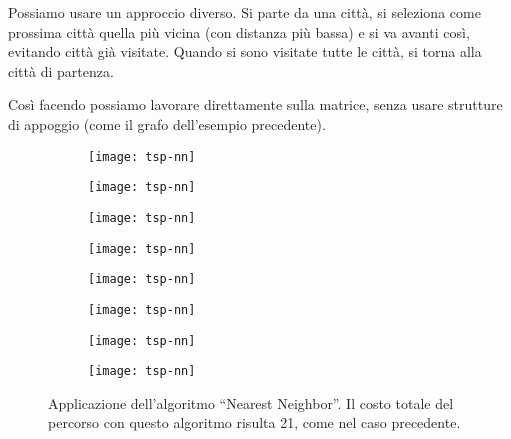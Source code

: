 Possiamo usare un approccio diverso.
Si parte da una città, si seleziona come prossima città quella più vicina (con distanza più bassa) e si va avanti così, evitando città già visitate.
Quando si sono visitate tutte le città, si torna alla città di partenza.

Così facendo possiamo lavorare direttamente sulla matrice, senza usare strutture di appoggio (come il grafo dell'esempio precedente).

\begin{figure}[H]\centering
	\begin{subfigure}{.25\linewidth}\centering
		\texttt{[image: tsp-nn]}
	\end{subfigure}%
	\begin{subfigure}{.25\linewidth}\centering
		\texttt{[image: tsp-nn]}
	\end{subfigure}%
	\begin{subfigure}{.25\linewidth}\centering
		\texttt{[image: tsp-nn]}
	\end{subfigure}%
	\begin{subfigure}{.25\linewidth}\centering
		\texttt{[image: tsp-nn]}
	\end{subfigure}%

	\vspace{10pt}

	\begin{subfigure}{.25\linewidth}\centering
		\texttt{[image: tsp-nn]}
	\end{subfigure}%
	\begin{subfigure}{.25\linewidth}\centering
		\texttt{[image: tsp-nn]}
	\end{subfigure}%
	\begin{subfigure}{.25\linewidth}\centering
		\texttt{[image: tsp-nn]}
	\end{subfigure}%
	\begin{subfigure}{.25\linewidth}\centering
		\texttt{[image: tsp-nn]}
	\end{subfigure}%

	\caption[Applicazione dell'algoritmo ingordo \enquote{Nearest Neighbor} per {\tsp}]{Applicazione dell'algoritmo \enquote{Nearest Neighbor}. Il costo totale del percorso con questo algoritmo risulta 21, come nel caso precedente.}
\end{figure}

